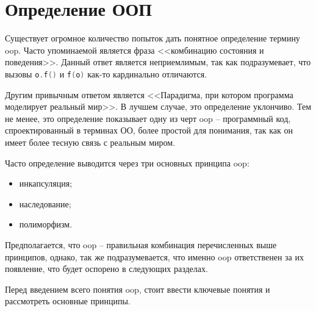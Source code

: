 \section{Определение ООП}\label{sec:history}

Существует огромное количество попыток дать понятное определение термину \gls{oop}. Часто упоминаемой является фраза <<комбинацию состояния и поведения>>. Данный ответ является неприемлимым, так как подразумевает, что вызовы \lstinline[language=C]{o.f()} и \lstinline[language=C]{f(o)} как-то кардинально отличаются.

Другим привычным ответом является <<Парадигма, при котором программа моделирует реальный мир>>. В лучшем случае, это определение уклончиво. Тем не менее, это определение показывает одну из черт \gls{oop} -- программный код, спроектированный в терминах ОО, более простой для понимания, так как он имеет более тесную связь с реальным миром.

Часто определение выводится через три основных принципа \gls{oop}:
\begin{itemize}
	\item инкапсуляция;
	\item наследование;
	\item полиморфизм.
\end{itemize}

Предполагается, что \gls{oop} -- правильная комбинация перечисленных выше принципов, однако, так же подразумевается, что именно \gls{oop} ответственен за их появление, что будет оспорено в следующих разделах.

Перед введением всего понятия \gls{oop}, стоит ввести ключевые понятия и рассмотреть основные принципы.